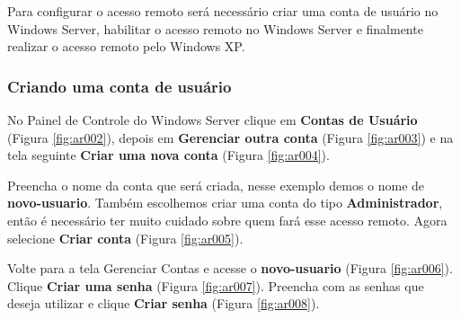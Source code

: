 \documentclass[10pt]{article}
\begin{document}
\par Para configurar o acesso remoto será necessário criar uma conta de usuário no Windows Server, habilitar o acesso remoto no Windows Server e finalmente realizar o acesso remoto pelo Windows XP. 

\subsubsection{Criando uma conta de usuário}

\par No Painel de Controle do Windows Server clique em \textbf{Contas de Usuário} (Figura \ref{fig:ar002}), depois em \textbf{Gerenciar outra conta} (Figura \ref{fig:ar003}) e na tela seguinte \textbf{Criar uma nova conta} (Figura \ref{fig:ar004}).

\par Preencha o nome da conta que será criada, nesse exemplo demos o nome de \textbf{novo-usuario}. Também escolhemos criar uma conta do tipo \textbf{Administrador}, então é necessário ter muito cuidado sobre quem fará esse acesso remoto. Agora selecione \textbf{Criar conta} (Figura \ref{fig:ar005}).

\par Volte para a tela Gerenciar Contas e acesse o \textbf{novo-usuario} (Figura \ref{fig:ar006}). Clique \textbf{Criar uma senha} (Figura \ref{fig:ar007}). Preencha com as senhas que deseja utilizar e clique \textbf{Criar senha} (Figura \ref{fig:ar008}).
\end{document}
